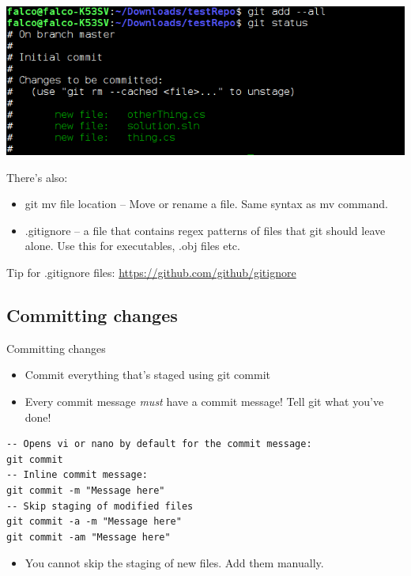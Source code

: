\documentclass[10pt,a4paper]{beamer}
\begin{document}
\begin{frame}
\includegraphics[width=\linewidth]{gitaddall.png}
\end{frame}

\begin{frame}
There's also:
\begin{itemize}
\item git mv file location -- Move or rename a file. Same syntax as mv command.
\item .gitignore -- a file that contains regex patterns of files that git should leave alone. Use this for executables, .obj files etc.
\end{itemize}
Tip for .gitignore files:
\href{http://git-scm.com/downloads/guis}{\color{blue}https://github.com/github/gitignore}
\end{frame}

\subsection{Committing changes}
\begin{frame}[fragile]{Committing changes}
\begin{itemize}
\item Commit everything that's staged using git commit
\item Every commit message \textit{must} have a commit message! Tell git what you've done!
\end{itemize}
\begin{verbatim}
-- Opens vi or nano by default for the commit message:
git commit
-- Inline commit message:
git commit -m "Message here"
-- Skip staging of modified files
git commit -a -m "Message here"
git commit -am "Message here"
\end{verbatim}
\begin{itemize}
\item You cannot skip the staging of new files. Add them manually.
\end{itemize}
\end{frame}
\end{document}
